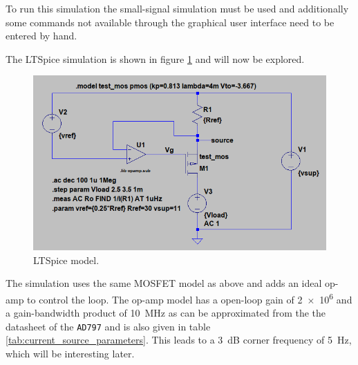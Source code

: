\documentclass[12pt]{book}
\providecommand{\device}[1]{\texttt{\small #1}}
\begin{document}
To run this simulation the small-signal simulation must be used and additionally some commands not available through the graphical user interface need to be entered by hand.

The LTSpice simulation is shown in figure \ref{fig:ltspice_output_impedance_example} and will now be explored.
\begin{figure}[hb]
    \centering
    \includegraphics[width=0.8\linewidth]{../images/ltspice_output_impedance.png}
    \caption{LTSpice model.}
    \label{fig:ltspice_output_impedance_example}
\end{figure}

The simulation uses the same MOSFET model as above and adds an ideal op-amp to control the loop. The op-amp model has a open-loop gain of \num{2e6} and a gain-bandwidth product of \qty{10}{\MHz} as can be approximated from the the datasheet of the \device{AD797} \cite{datasheet_AD797} and is also given in table \ref{tab:current_source_parameters}. This leads to a \qty{3}{\dB} corner frequency of \qty{5}{\Hz}, which will be interesting later.
\end{document}
